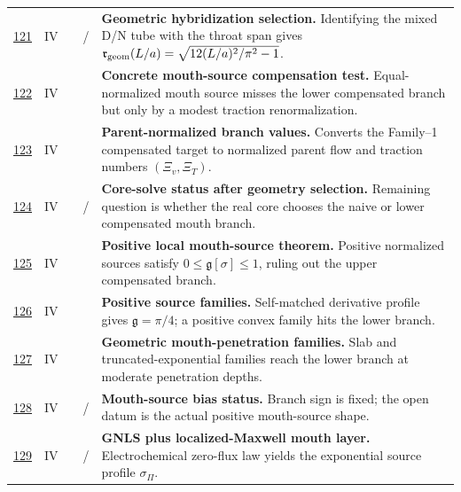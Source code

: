 {\begin{longtable}{@{}L{0.055\textwidth}L{0.075\textwidth}L{0.145\textwidth}L{0.235\textwidth}L{0.43\textwidth}@{}}
\addlinespace
\hyperref[stage:121]{121} & IV &  & \StatusExactClosure{} / \StatusReduced{} & \textbf{Geometric hybridization selection.} Identifying the mixed D/N tube with the throat span gives \(\mathfrak r_{\rm geom}(L/a)=\sqrt{12(L/a)^2/\pi^2-1}\). \\
\addlinespace
\hyperref[stage:122]{122} & IV &  & \StatusExactClosure{} & \textbf{Concrete mouth-source compensation test.} Equal-normalized mouth source misses the lower compensated branch but only by a modest traction renormalization. \\
\addlinespace
\hyperref[stage:123]{123} & IV &  & \StatusExactClosure{} & \textbf{Parent-normalized branch values.} Converts the Family--1 compensated target to normalized parent flow and traction numbers \((\Xi_v,\Xi_T)\). \\
\addlinespace
\hyperref[stage:124]{124} & IV &  & \StatusExactClosure{} / \StatusOpen{} & \textbf{Core-solve status after geometry selection.} Remaining question is whether the real core chooses the naive or lower compensated mouth branch. \\
\addlinespace
\hyperref[stage:125]{125} & IV &  & \StatusExactClosure{} & \textbf{Positive local mouth-source theorem.} Positive normalized sources satisfy \(0\le\mathfrak g[\sigma]\le1\), ruling out the upper compensated branch. \\
\addlinespace
\hyperref[stage:126]{126} & IV &  & \StatusExactClosure{} & \textbf{Positive source families.} Self-matched derivative profile gives \(\mathfrak g=\pi/4\); a positive convex family hits the lower branch. \\
\addlinespace
\hyperref[stage:127]{127} & IV &  & \StatusExactClosure{} & \textbf{Geometric mouth-penetration families.} Slab and truncated-exponential families reach the lower branch at moderate penetration depths. \\
\addlinespace
\hyperref[stage:128]{128} & IV &  & \StatusExactClosure{} / \StatusOpen{} & \textbf{Mouth-source bias status.} Branch sign is fixed; the open datum is the actual positive mouth-source shape. \\
\addlinespace
\hyperref[stage:129]{129} & IV &  & \StatusReduced{} / \StatusExactClosure{} & \textbf{GNLS plus localized-Maxwell mouth layer.} Electrochemical zero-flux law yields the exponential source profile \(\sigma_\Pi\). \\

\end{longtable}}
